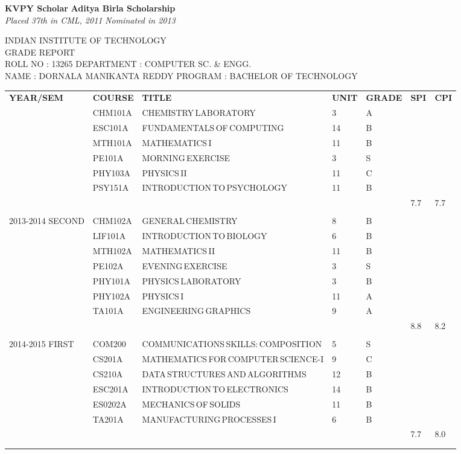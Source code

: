 \documentclass{article}
\newcommand{\sepspace}{\vspace*{1em}}
\newcommand{\ScholasticAcheivements}[4]{
		\noindent \textbf{#1} \hfill \textbf{#2} \\
		\textit{#3}	 \hfill	 \textit{ #4} 	
		\normalsize \par
		}
\newcommand{\transcriptentry}[6]{
		\tiny{#1} & \tiny{#2} & \tiny{#3} & \tiny{#4} & \tiny{#5} & \tiny{#6} \\ 
		}
\begin{document}
\sepspace

\ScholasticAcheivements{KVPY Scholar}{Aditya Birla Scholarship}{Placed 37th in CML, 2011}{Nominated in 2013}

\sepspace

\begin{center}
	\tiny{INDIAN INSTITUTE OF TECHNOLOGY}\\
	\tiny{GRADE REPORT}\\
	\tiny{ROLL NO : 13265} \hfill \tiny{DEPARTMENT : COMPUTER SC. \& ENGG.}\\
	\tiny{NAME : DORNALA MANIKANTA REDDY} \hfill \tiny{PROGRAM : BACHELOR OF TECHNOLOGY}\\
\end{center}
\begin{center}
	\begin{tabular}{m{5em}  m{1.5cm} m{5cm} m{0.5cm} m{0.7cm} m{0.3cm} m{0.5cm}} 
	\hdashline
	\tiny{\textbf{YEAR/SEM}} & \transcriptentry{\textbf{COURSE}}{\textbf{TITLE}}{\textbf{UNIT}}{\textbf{GRADE}}{\textbf{SPI}}{\textbf{CPI}}
	\hdashline
	\multirow{7}{5em}{\tiny{2013-2014 FIRST}}
		& \transcriptentry{CHM101A}{CHEMISTRY\,LABORATORY}{3}{A}{}{}
		& \transcriptentry{ESC101A}{FUNDAMENTALS\,OF\,COMPUTING}{14}{B}{}{}
		& \transcriptentry{MTH101A}{MATHEMATICS\,I}{11}{B}{}{}
		& \transcriptentry{PE101A}{MORNING\,EXERCISE}{3}{S}{}{}
		& \transcriptentry{PHY103A}{PHYSICS\,II}{11}{C}{}{}
		& \transcriptentry{PSY151A}{INTRODUCTION\,TO\,PSYCHOLOGY}{11}{B}{}{}
		& \transcriptentry{}{}{}{}{7.7}{7.7}
		\\
	\multirow{7}{5em}{\tiny{2013-2014 SECOND}}
		& \transcriptentry{CHM102A}{GENERAL\,CHEMISTRY}{8}{B}{}{}
		& \transcriptentry{LIF101A}{INTRODUCTION\,TO\,BIOLOGY}{6}{B}{}{}
		& \transcriptentry{MTH102A}{MATHEMATICS\,II}{11}{B}{}{}
		& \transcriptentry{PE102A}{EVENING\,EXERCISE}{3}{S}{}{}
		& \transcriptentry{PHY101A}{PHYSICS\,LABORATORY}{3}{B}{}{}
		& \transcriptentry{PHY102A}{PHYSICS\,I}{11}{A}{}{}
		& \transcriptentry{TA101A}{ENGINEERING\,GRAPHICS}{9}{A}{}{}
		& \transcriptentry{}{}{}{}{8.8}{8.2}
		\\	
	\multirow{7}{5em}{\tiny{2014-2015 FIRST}}
		& \transcriptentry{COM200}{COMMUNICATIONS\,SKILLS:\,COMPOSITION}{5}{S}{}{}
		& \transcriptentry{CS201A}{MATHEMATICS\,FOR\,COMPUTER\,SCIENCE-I}{9}{C}{}{}
		& \transcriptentry{CS210A}{DATA\,STRUCTURES\,AND\,ALGORITHMS}{12}{B}{}{}
		& \transcriptentry{ESC201A}{INTRODUCTION\,TO\,ELECTRONICS}{14}{B}{}{}
		& \transcriptentry{ES0202A}{MECHANICS\,OF\,SOLIDS}{11}{B}{}{}
		& \transcriptentry{TA201A}{MANUFACTURING\,PROCESSES\,I}{6}{B}{}{}
		& \transcriptentry{}{}{}{}{7.7}{8.0}\\
	\hdashline
	\end{tabular}
\end{center}
\end{document}
